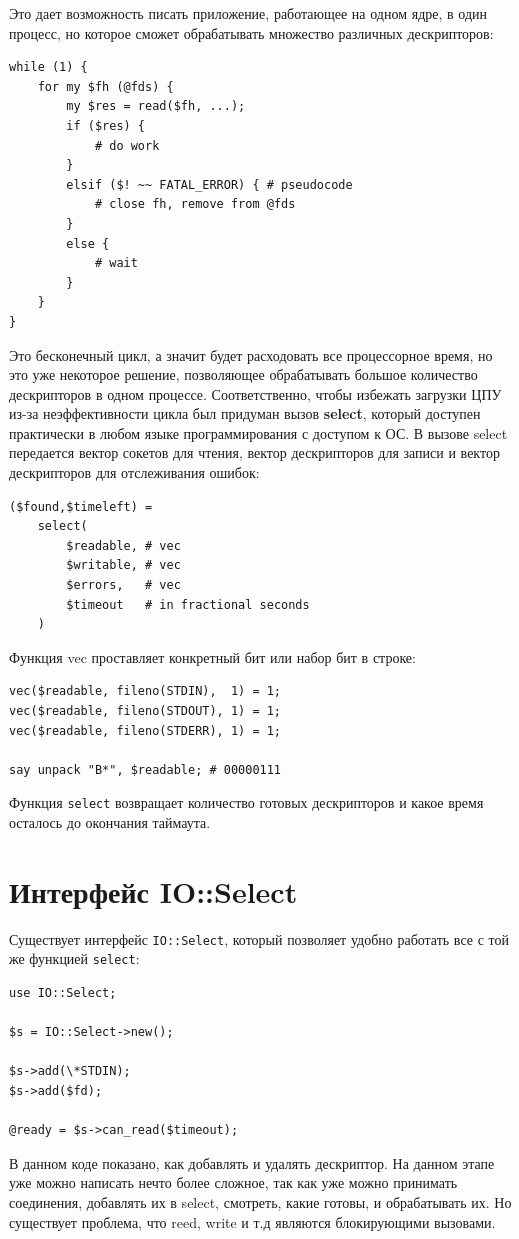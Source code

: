 Это дает возможность писать приложение, работающее на одном ядре, в один процесс, но которое сможет обрабатывать множество различных дескрипторов:
\begin{verbatim}
while (1) {
    for my $fh (@fds) {
        my $res = read($fh, ...);
        if ($res) {
            # do work
        }
        elsif ($! ~~ FATAL_ERROR) { # pseudocode
            # close fh, remove from @fds
        }
        else {
            # wait
        }
    }
}
\end{verbatim}
Это бесконечный цикл, а значит будет расходовать все процессорное время, но это уже некоторое решение, позволяющее обрабатывать большое количество дескрипторов в одном процессе. Соответственно, чтобы избежать загрузки ЦПУ из-за неэффективности цикла был придуман вызов \textbf{select}, который доступен практически в любом языке программирования с доступом к ОС. В вызове select передается вектор сокетов для чтения, вектор дескрипторов для записи и вектор дескрипторов для отслеживания ошибок:
\begin{verbatim}
($found,$timeleft) =
    select(
        $readable, # vec
        $writable, # vec
        $errors,   # vec
        $timeout   # in fractional seconds
    )
\end{verbatim}
Функция vec проставляет конкретный бит или набор бит в строке:
\begin{verbatim}
vec($readable, fileno(STDIN),  1) = 1;
vec($readable, fileno(STDOUT), 1) = 1;
vec($readable, fileno(STDERR), 1) = 1;

say unpack "B*", $readable; # 00000111
\end{verbatim}
Функция \verb|select| возвращает количество готовых дескрипторов и какое время осталось до окончания таймаута.

\section{Интерфейс IO::Select}
Существует интерфейс \verb|IO::Select|, который позволяет удобно работать все с той же функцией \verb|select|:
\begin{verbatim}
use IO::Select;

$s = IO::Select->new();

$s->add(\*STDIN);
$s->add($fd);

@ready = $s->can_read($timeout);
\end{verbatim}
В данном коде показано, как добавлять и удалять дескриптор. На данном этапе уже можно написать нечто более сложное, так как уже можно принимать соединения, добавлять их в select, смотреть, какие готовы, и обрабатывать их. Но существует проблема, что reed, write и т.д являются блокирующими вызовами.

